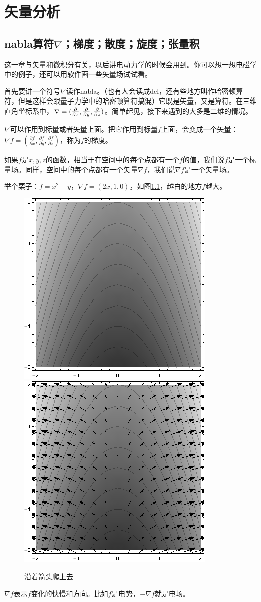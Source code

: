 \chapter{矢量分析}
\section{nabla算符$\nabla$；梯度；散度；旋度；张量积}
这一章与矢量和微积分有关，以后讲电动力学的时候会用到。你可以想一想电磁学中的例子，还可以用软件画一些矢量场试试看。

首先要讲一个符号$\nabla$读作nabla。（也有人会读成del，还有些地方叫作哈密顿算符，但是这样会跟量子力学中的哈密顿算符搞混）它既是矢量，又是算符。在三维直角坐标系中，$\nabla=(\frac{\partial}{\partial x},\frac{\partial}{\partial y},\frac{\partial}{\partial z})$。简单起见，接下来遇到的大多是二维的情况。

$\nabla$可以作用到标量或者矢量上面。把它作用到标量$f$上面，会变成一个矢量：$\nabla f=(\frac{\partial f}{\partial x},\frac{\partial f}{\partial y},\frac{\partial f}{\partial z})$，称为$f$的梯度。

如果$f$是$x,y,z$的函数，相当于在空间中的每个点都有一个$f$的值，我们说$f$是一个标量场。同样，空间中的每个点都有一个矢量$\nabla f$，我们说$\nabla f$是一个矢量场。

举个栗子：$f=x^2+y$，$\nabla f=(2x,1,0)$，如图\ref{fig-vec-grad}，越白的地方$f$越大。
\begin{figure}[htb]
\centering
\includegraphics[width=0.33\linewidth]{fig/vec-grad.png}
\includegraphics[width=0.33\linewidth]{fig/vec-grad-2.png}
\caption{沿着箭头爬上去}
\label{fig-vec-grad}
\end{figure}

$\nabla f$表示$f$变化的快慢和方向。比如$f$是电势，$-\nabla f$就是电场。

